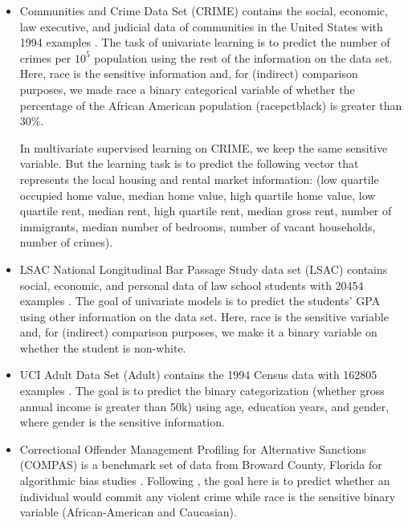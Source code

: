 \documentclass[twoside,11pt]{article}
\begin{document}
\begin{itemize}
\setlength{\parsep}{-0.2ex}
\setlength{\itemsep}{-0.2ex}
\item Communities and Crime Data Set (CRIME) contains the social, economic, law executive, and judicial data of communities in the United States with 1994 examples \cite{redmond2002data}. The task of univariate learning is to predict the number of crimes per $10^5$ population using the rest of the information on the data set. Here, race is the sensitive information and, for (indirect) comparison purposes, we made race a binary categorical variable of whether the percentage of the African American population (racepctblack) is greater than $30\%$.

In multivariate supervised learning on CRIME, we keep the same sensitive variable. But the learning task is to predict the following vector that represents the local housing and rental market information: (low quartile occupied home value, median home value, high quartile home value, low quartile rent, median rent,  high quartile rent, median gross rent, number of immigrants, median number of bedrooms, number of vacant households, number of crimes).

\item LSAC National Longitudinal Bar Passage Study data set (LSAC) contains social, economic, and personal data of law school students with 20454 examples \cite{wightman1998lsac}. The goal of univariate models is to predict the students' GPA using other information on the data set. Here, race is the sensitive variable and, for (indirect) comparison purposes, we make it a binary variable on whether the student is non-white. 

\item UCI Adult Data Set (Adult) contains the 1994 Census data with 162805 examples \cite{asuncion2007uci}. The goal is to predict the binary categorization (whether gross annual income is greater than 50k) using age, education years, and gender, where gender is the sensitive information.

\item Correctional Offender Management Profiling for Alternative Sanctions (COMPAS) is a benchmark set of data from Broward County, Florida for algorithmic bias studies \cite{angwin2022machine}. Following \cite{calmon2017optimized}, the goal here is to predict whether an individual would commit any violent crime while race is the sensitive binary variable (African-American and Caucasian).

\end{itemize}
\end{document}
